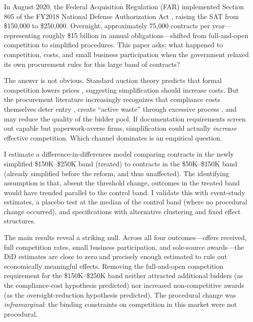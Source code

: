 \documentclass[12pt]{article}
\begin{document}
In August 2020, the Federal Acquisition Regulation (FAR) implemented Section 805 of the FY2018 National Defense Authorization Act \citep{ndaa2018}, raising the SAT from \$150,000 to \$250,000. Overnight, approximately 75,000 contracts per year---representing roughly \$15 billion in annual obligations---shifted from full-and-open competition to simplified procedures. This paper asks: what happened to competition, costs, and small business participation when the government relaxed its own procurement rules for this large band of contracts?

The answer is not obvious. Standard auction theory predicts that formal competition lowers prices \citep{bulow1996}, suggesting simplification should increase costs. But the procurement literature increasingly recognizes that compliance costs themselves deter entry \citep{bandiera2009, krasnokutskaya2011}, create ``active waste'' through excessive process \citep{bandiera2009}, and may reduce the quality of the bidder pool. If documentation requirements screen out capable but paperwork-averse firms, simplification could actually \textit{increase} effective competition. Which channel dominates is an empirical question.

I estimate a difference-in-differences model comparing contracts in the newly simplified \$150K--\$250K band (treated) to contracts in the \$50K--\$150K band (already simplified before the reform, and thus unaffected). The identifying assumption is that, absent the threshold change, outcomes in the treated band would have trended parallel to the control band. I validate this with event-study estimates, a placebo test at the median of the control band (where no procedural change occurred), and specifications with alternative clustering and fixed effect structures.

The main results reveal a striking null. Across all four outcomes---offers received, full competition rates, small business participation, and sole-source awards---the DiD estimates are close to zero and precisely enough estimated to rule out economically meaningful effects. Removing the full-and-open competition requirement for the \$150K--\$250K band neither attracted additional bidders (as the compliance-cost hypothesis predicted) nor increased non-competitive awards (as the oversight-reduction hypothesis predicted). The procedural change was \textit{inframarginal}: the binding constraints on competition in this market were not procedural.
\end{document}
